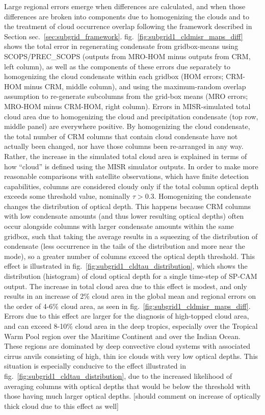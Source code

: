 Large regional errors emerge when differences are calculated, and when
those differences are broken into components due to homogenizing the
clouds and to the treatment of cloud occurrence overlap following the
framework described in Section sec.~\ref{sec:subgrid_framework}.
fig.~\ref{fig:subgrid1_cldmisr_maps_diff} shows the total error in
regenerating condensate from gridbox-means using SCOPS/PREC\_SCOPS
(outputs from MRO-HOM minus outputs from CRM, left column), as well as
the components of these errors due separately to homogenizing the cloud
condensate within each gridbox (HOM errors; CRM-HOM minus CRM, middle
column), and using the maximum-random overlap assumption to re-generate
subcolumns from the grid-box means (MRO errors; MRO-HOM minus CRM-HOM,
right column). Errors in MISR-simulated total cloud area due to
homogenizing the cloud and precipitation condensate (top row, middle
panel) are everywhere positive. By homogenizing the cloud condensate,
the total number of CRM columns that contain cloud condensate have not
actually been changed, nor have those columns been re-arranged in any
way. Rather, the increase in the simulated total cloud area is explained
in terms of how ``cloud'' is defined using the MISR simulator outputs.
In order to make more reasonable comparisons with satellite
observations, which have finite detection capabilities, columns are
considered cloudy only if the total column optical depth exceeds some
threshold value, nominally \(\tau > 0.3\). Homogenizing the condensate
changes the distribution of optical depth. This happens because CRM
columns with low condensate amounts (and thus lower resulting optical
depths) often occur alongside columns with larger condensate amounts
within the same gridbox, such that taking the average results in a
squeezing of the distribution of condensate (less occurrence in the
tails of the distribution and more near the mode), so a greater number
of columns exceed the optical depth threshold. This effect is
illustrated in fig.~\ref{fig:subgrid1_cldtau_distribution}, which shows
the distribution (histogram) of cloud optical depth for a single
time-step of SP-CAM output. The increase in total cloud area due to this
effect is modest, and only results in an increase of 2\% cloud area in
the global mean and regional errors on the order of 4-6\% cloud area, as
seen in fig.~\ref{fig:subgrid1_cldmisr_maps_diff}. Errors due to this
effect are larger for the diagnosis of high-topped cloud area, and can
exceed 8-10\% cloud area in the deep tropics, especially over the
Tropical Warm Pool region over the Maritime Continent and over the
Indian Ocean. These regions are dominated by deep convective cloud
systems with associated cirrus anvils consisting of high, thin ice
clouds with very low optical depths. This situation is especially
conducive to the effect illustrated in
fig.~\ref{fig:subgrid1_cldtau_distribution}, due to the increased
likelihood of averaging columns with optical depths that would be below
the threshold with those having much larger optical depths. {[}should
comment on increase of optically thick cloud due to this effect as
well{]}

